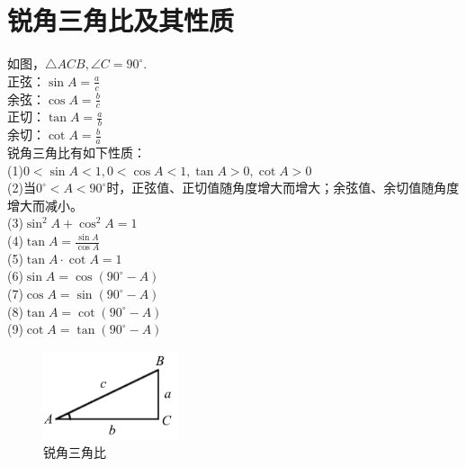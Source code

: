 \documentclass{ecnuthesis}
\begin{document}
\section{锐角三角比及其性质}
\begin{knowledge}
    如图，$\triangle ACB,\angle C=90^\circ$. \\
    正弦：$\sin A=\frac{a}{c}$ \\
    余弦：$\cos A=\frac{b}{c}$ \\
    正切：$\tan A=\frac{a}{b}$ \\
    余切：$\cot A=\frac{b}{a}$ \\
    锐角三角比有如下性质：\\
    (1)$0 < \sin A < 1, 0 < \cos A < 1, \tan A > 0, \cot A > 0$ \\
    (2)当$0^\circ < A < 90^\circ$时，正弦值、正切值随角度增大而增大；余弦值、余切值随角度增大而减小。\\
    (3)$\sin^2 A+\cos^2 A=1$ \\
    (4)$\tan A=\frac{\sin A}{\cos A}$ \\
    (5)$\tan A·\cot A=1$ \\
    (6)$\sin A=\cos(90^\circ-A)$ \\
    (7)$\cos A=\sin(90^\circ-A)$ \\
    (8)$\tan A=\cot(90^\circ-A)$ \\
    (9)$\cot A=\tan(90^\circ-A)$ \\
\end{knowledge}
\begin{figure}[H]
\centering
\includegraphics[width=4cm]{picture/901.png}
\caption{锐角三角比}
\end{figure}
\clearpage
\end{document}
